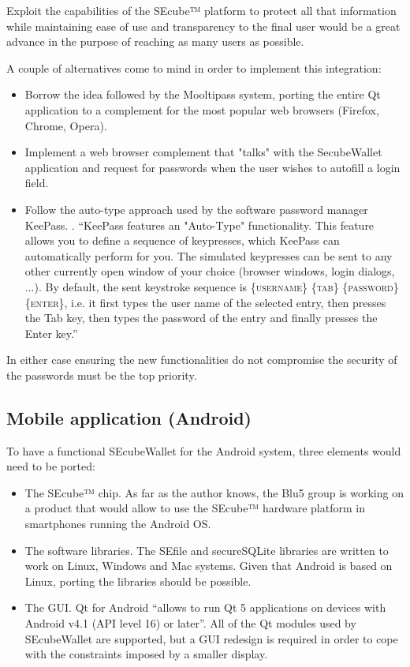 Exploit the capabilities of the SEcube™ platform to protect all that information while maintaining ease of use and transparency to the final user would be a great advance in the purpose of reaching as many users as possible.

A couple of alternatives come to mind in order to implement this integration:
\begin{itemize}
\setlength\itemsep{0pt}
\item Borrow the idea followed by the Mooltipass system, porting the entire Qt application to a complement for the most popular web browsers (Firefox, Chrome, Opera).
\item Implement a web browser complement that "talks" with the SecubeWallet application and request for passwords when the user wishes to autofill a login field.
\item Follow the auto-type approach used by the software password manager KeePass. \cite{autotype}. ``KeePass features an "Auto-Type" functionality. This feature allows you to define a sequence of keypresses, which KeePass can automatically perform for you. The simulated keypresses can be sent to any other currently open window of your choice (browser windows, login dialogs, ...). By default, the sent keystroke sequence is \{\textsc{username}\} \{\textsc{tab}\} \{\textsc{password}\} \{\textsc{enter}\}, i.e. it first types the user name of the selected entry, then presses the Tab key, then types the password of the entry and finally presses the Enter key.''
\end{itemize}

In either case ensuring the new functionalities do not compromise the security of the passwords must be the top priority.

\subsection{Mobile application (Android)}
To have a functional SEcubeWallet for the Android system, three elements would need to be ported:
\begin{itemize}
\item The SEcube™ chip. As far as the author knows, the Blu5 group is working on a product that would allow to use the SEcube™ hardware platform in smartphones running the Android OS.
\item The software libraries. The SEfile and secureSQLite libraries are written to work on Linux, Windows and Mac systems. Given that Android is based on Linux, porting the libraries should be possible.
\item The GUI. Qt for Android \cite{android} ``allows to run Qt 5 applications on devices with Android v4.1 (API level 16) or later''. All of the Qt modules used by SEcubeWallet are supported, but a GUI redesign is required in order to cope with the constraints imposed by a smaller display.
\end{itemize}


